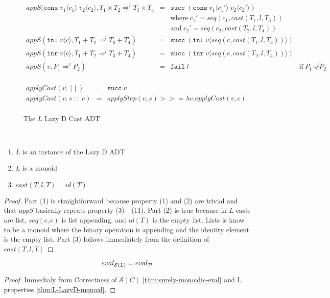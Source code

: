 \documentclass[acmsmall,review,anonymous]{acmart}\settopmatter{printfolios=true,printccs=false,printacmref=false}
\newcommand{\funrule}[3]{#1 &=& #2 & #3\\}
\newcommand{\plus}[0]{+}
\newcommand{\POOprod}[2]{#1 \times #2}
\newcommand{\POOsum}[2]{#1 \plus #2}
\newcommand{\cOOcast}[3]{#1 \Rightarrow^{#2} #3}
\newcommand{\rOOsucc}[1]{\mathtt{succ}\;#1}
\newcommand{\rOOfail}[1]{\mathtt{fail}\;#1}
\newcommand{\hcvOOcons}[4]{\mathtt{cons}\;#1\langle#2\rangle\;#3\langle#4\rangle}
\newcommand{\hcvOOinl}[2]{\mathtt{inl}\;#1\langle#2\rangle}
\newcommand{\hcvOOinr}[2]{\mathtt{inr}\;#1\langle#2\rangle}
\newcommand{\sidecond}[1]{\text{if}\;#1}
\newcommand{\ineffCEKD}{$\mathcal{D}$}
\newcommand{\effCEK}[1]{$\mathcal{S}(#1)$}
\newcommand{\evalEqv}[2]{\ensuremath{eval_{\text{#1}} = eval_{\text{#2}}}}
\newcommand{\lsOOcast}[3]{\cOOcast{#1}{#2}{#3}}
\newcommand{\lcOOnull}[0]{[]}
\newcommand{\lcOOcons}[2]{#1 \; :: \; #2}
\begin{document}
\begin{figure}
\[\begin{array}{rclr}
\funrule{
  appS(
    \hcvOOcons{v_1}{c_1}{v_2}{c_2},
    \lsOOcast{\POOprod{T_1}{T_2}}{l}{\POOprod{T_3}{T_4}}
}{
  \rOOsucc{(\hcvOOcons{v_1}{c_1'}{v_2}{c_2'})}
}{
\\ &&
\text{where} \;
c_1' = seq(c_1,cast(T_1,l,T_3))
\\ &&
\text{and} \;
c_2' = seq(c_2,cast(T_2,l,T_4))
}
\funrule{
  appS(\hcvOOinl{v}{c},\lsOOcast{\POOsum{T_1}{T_2}}{l}{\POOsum{T_3}{T_4}})
}{
  \rOOsucc{(\hcvOOinl{v}{seq(c,cast(T_1,l,T_3))})}
}{}
\funrule{
  appS(\hcvOOinr{v}{c},\lsOOcast{\POOsum{T_1}{T_2}}{l}{\POOsum{T_3}{T_4}})
}{
  \rOOsucc{(\hcvOOinr{v}{seq(c,cast(T_2,l,T_4))})}
}{}
\funrule{
  appS(v,\cOOcast{P_1}{l}{P_2})
}{
  \rOOfail{l}
}{\sidecond{P_1 \not\smile P_2}}

\end{array}
\]


\[
\begin{array}{rclr}
\funrule{
  applyCast(v,\lcOOnull)
}{
  \rOOsucc{v}
}{}
\funrule{
  applyCast(v,\lcOOcons{s}{c})
}{
  applyStep(v,s) >>= \lambda v. applyCast(v,c)
}{}
\end{array}
\]

  \caption{The $L$ Lazy D Cast ADT}
\end{figure}

\begin{proposition}[$L$ properties]\label{thm:L-LazyD-monoid}\ 
  \begin{enumerate}
  \item $L$ is an instance of the Lazy D ADT
  \item $L$ is a monoid
  \item $cast(T,l,T) = id(T)$
  \end{enumerate}
\end{proposition}
\begin{proof}
  Part (1) is straightforward because property (1) and (2) are trivial and 
  that $appS$ basically repeats property (3) - (11).
  Part (2) is true because in $L$ casts are list, $seq(c,c)$ is list 
  appending, and $id(T)$ is the empty list. Lists is know to be a monoid 
  where the binary operation is appending and the identity element is the 
  empty list.
  Part (3) follows immediately from the definition of $cast(T,l,T)$
\end{proof}

\begin{lemma}[$L$ is correct wrt. \ineffCEKD]
  \label{lem:L-correct}
  \[
  \text{\evalEqv{\effCEK{L}}{\ineffCEKD}}
  \]
\end{lemma}
\begin{proof}
  Immedialy from Correctness of \effCEK{C} \ref{thm:surely-monoidic-eval} and 
  L properties \ref{thm:L-LazyD-monoid}.
\end{proof}
\end{document}

